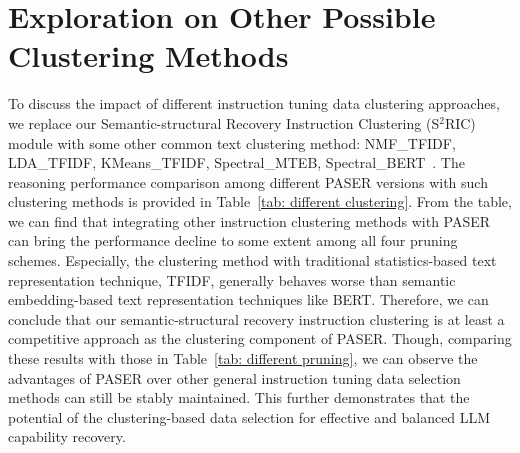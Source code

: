 \section{Exploration on Other Possible Clustering Methods}
\label{appendix: clustering}
To discuss the impact of different instruction tuning data clustering approaches, we replace our Semantic-structural Recovery Instruction Clustering (S$^2$RIC) module with some other common text clustering method: NMF\_TFIDF, LDA\_TFIDF, KMeans\_TFIDF, Spectral\_MTEB, Spectral\_BERT~\citep{xu2024data}. The reasoning performance comparison among different PASER versions with such clustering methods is provided in Table~\ref{tab: different clustering}. From the table, we can find that integrating other instruction clustering methods with PASER can bring the performance decline to some extent among all four pruning schemes. Especially, the clustering method with traditional statistics-based text representation technique, TFIDF, generally behaves worse than semantic embedding-based text representation techniques like BERT. Therefore, we can conclude that our semantic-structural recovery instruction clustering is at least a competitive approach as the clustering component of PASER. Though, comparing these results with those in Table~\ref{tab: different pruning}, we can observe the advantages of PASER over other general instruction tuning data selection methods can still be stably maintained. This further demonstrates that the potential of the clustering-based data selection for effective and balanced LLM capability recovery.

